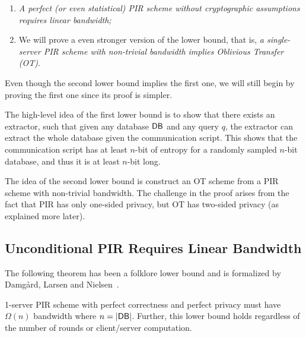 \begin{enumerate}
    \item \textit{A perfect (or even statistical) PIR scheme without cryptographic assumptions requires linear bandwidth;}
    \item We will prove a even stronger version of the lower bound, that is, 
\textit{a single-server PIR scheme with non-trivial bandwidth implies Oblivious Transfer (OT)}.
\end{enumerate}

Even though the second lower bound implies the first one,
we will still begin by proving the first one since its proof is simpler. 

The high-level idea of the first lower bound is to show that there exists an extractor, such that given any database ${\sf DB}$ and any query $q$, the extractor can extract the whole database given the communication script.
This shows that the communication script has at least $n$-bit of entropy for a  
randomly sampled $n$-bit database, 
and thus it is at least $n$-bit long. 

The idea of the second lower bound is construct an OT  
scheme from a PIR scheme 
with non-trivial bandwidth.
The challenge in the proof arises from the fact that PIR has only one-sided
privacy, but OT has two-sided privacy (as explained more later).







\subsection{Unconditional PIR Requires Linear Bandwidth}

The following theorem has been a folklore lower bound and is formalized by Damg\r{a}rd, Larsen and Nielsen~\cite{DLN19}.

\begin{theorem}
1-server PIR scheme with perfect correctness and perfect privacy must have $\Omega(n)$ bandwidth where $n = |{\sf DB}|$. Further, this lower bound holds
regardless of the number of rounds or client/server computation.
\end{theorem}


